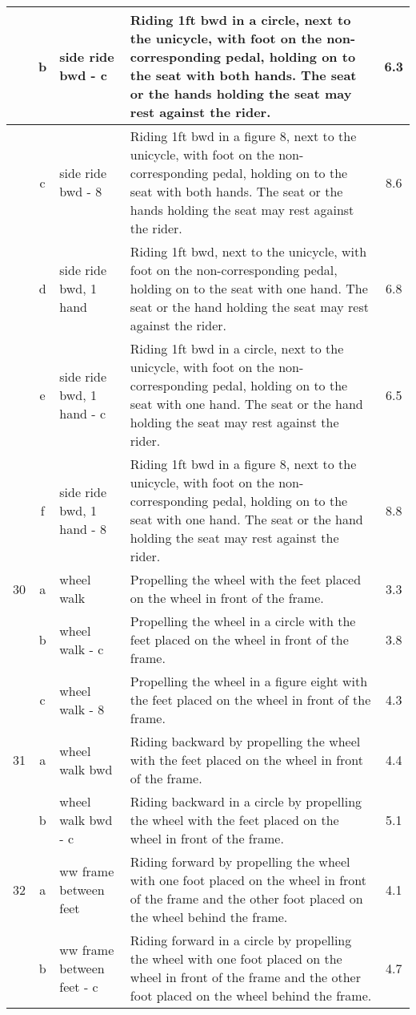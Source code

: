 \begin{longtable}{|r|c|p{4cm}|p{8cm}|c|}
\hline
  & b & side ride bwd - c & Riding 1ft bwd in a circle, next to the unicycle, with foot on the non-corresponding pedal, holding on to the seat with both hands. The seat or the hands holding the seat may rest against the rider.  & 6.3 \\ 
\hline
  & c & side ride bwd - 8 & Riding 1ft bwd in a figure 8, next to the unicycle, with foot on the non-corresponding pedal, holding on to the seat with both hands. The seat or the hands holding the seat may rest against the rider.  & 8.6 \\ 
\hline
  & d & side ride bwd, 1 hand & Riding 1ft bwd, next to the unicycle, with foot on the non-corresponding pedal, holding on to the seat with one hand. The seat or the hand holding the seat may rest against the rider. & 6.8 \\ 
\hline
  & e & side ride bwd, 1 hand - c & Riding 1ft bwd in a circle, next to the unicycle, with foot on the non-corresponding pedal, holding on to the seat with one hand. The seat or the hand holding the seat may rest against the rider. & 6.5 \\ 
\hline
  & f & side ride bwd, 1 hand - 8 & Riding 1ft bwd in a figure 8, next to the unicycle, with foot on the non-corresponding pedal, holding on to the seat with one hand. The seat or the hand holding the seat may rest against the rider. & 8.8 \\ 
\hline
30  & a & wheel walk  & Propelling the wheel with the feet placed on the wheel in front of the frame. & 3.3 \\ 
\hline
  & b & wheel walk - c  & Propelling the wheel in a circle with the feet placed on the wheel in front of the frame. & 3.8 \\ 
\hline
  & c & wheel walk - 8  & Propelling the wheel in a figure eight with the feet placed on the wheel in front of the frame. & 4.3 \\ 
\hline
31  & a & wheel walk bwd  & Riding backward by propelling the wheel with the feet placed on the wheel in front of the frame.  & 4.4 \\ 
\hline
  & b & wheel walk bwd - c  & Riding backward in a circle by propelling the wheel with the feet placed on the wheel in front of the frame.  & 5.1 \\ 
\hline
32  & a & ww frame between feet & Riding forward by propelling the wheel with one foot placed on the wheel in front of the frame and the other foot placed on the wheel behind the frame. & 4.1 \\ 
\hline
  & b & ww frame between feet - c & Riding forward in a circle by propelling the wheel with one foot placed on the wheel in front of the frame and the other foot placed on the wheel behind the frame. & 4.7 \\ 

\end{longtable}
